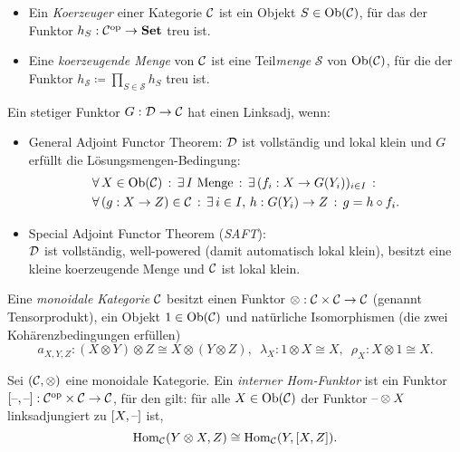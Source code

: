 \documentclass{cheat-sheet}
\begin{document}
\begin{defn}
  \begin{itemize}
    \item Ein \emph{Koerzeuger} einer Kategorie $\mathcal{C}$ ist ein Objekt $S \in \operatorname{Ob}(\mathcal{C})$, für das der Funktor $h_S : \mathcal{C}^{\mathrm{op}} \to \mathbf{Set}$ treu ist.
    \item Eine \emph{koerzeugende Menge} von $\mathcal{C}$ ist eine Teil\textit{menge} $\mathcal{S}$ von $\operatorname{Ob}(\mathcal{C})$, für die der Funktor $h_{\mathcal{S}} \coloneqq \prod_{S \in \mathcal{S}} h_S$ treu ist.
  \end{itemize}
\end{defn}

\begin{lem}
  Ein stetiger Funktor $G : \mathcal{D} \to \mathcal{C}$ hat einen Linksadj, wenn:
  \begin{itemize}
    \item General Adjoint Functor Theorem: $\mathcal{D}$ ist vollständig und lokal klein und $G$ erfüllt die Lösungsmengen-Bedingung:
    \begin{align*}
      & \forall \, {X \in \operatorname{Ob}(\mathcal{C})} \,:\, \exists \, {I \text{ Menge}} \,:\, \exists \, {(f_i : X \to G(Y_i))_{i \in I}} \,:\, \\
      & \forall \, {(g : X \to Z) \in \mathcal{C}} \,:\, \exists \, {i \in I, \, h : G(Y_i) \to Z} \,:\, g = h \circ f_i.
    \end{align*}
    \item Special Adjoint Functor Theorem (\emph{SAFT}): \\
    $\mathcal{D}$ ist vollständig, well-powered (damit automatisch lokal klein), besitzt eine kleine koerzeugende Menge und $\mathcal{C}$ ist lokal klein.
  \end{itemize}
\end{lem}

\begin{defn}
  Eine \emph{monoidale Kategorie} $\mathcal{C}$ besitzt einen Funktor $\otimes : \mathcal{C} \times \mathcal{C} \to \mathcal{C}$ (genannt Tensorprodukt), ein Objekt $1 \in \operatorname{Ob}(\mathcal{C})$ und natürliche Isomorphismen
  (die zwei Kohärenzbedingungen erfüllen)
  \[
    a_{X,Y,Z} : (X \otimes Y) \otimes Z \cong X \otimes (Y \otimes Z), \enspace
    \lambda_X : 1 \otimes X \cong X, \enspace
    \rho_X : X \otimes 1 \cong X.
  \]
\end{defn}

\begin{defn}
  Sei $(\mathcal{C}, \otimes)$ eine monoidale Kategorie. Ein \emph{interner Hom-Funktor} ist ein Funktor $[\text{--},\text{--}] : \mathcal{C}^{\mathrm{op}} \times \mathcal{C} \to \mathcal{C}$, für den gilt: für alle $X \in \operatorname{Ob}(\mathcal{C})$ der Funktor $\text{--} \otimes X$ linksadjungiert zu $[X, \text{--}]$ ist, \dh{}
  \[ \operatorname{Hom}_{\mathcal{C}}(Y \otimes X, Z) \cong \operatorname{Hom}_{\mathcal{C}}(Y, [X, Z]). \]
\end{defn}
\end{document}

